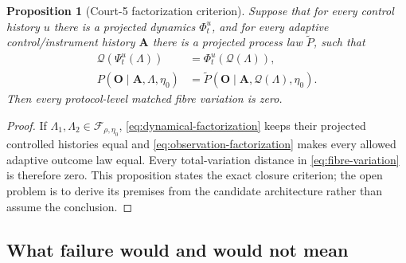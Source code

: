 \documentclass[10pt]{article}
\newtheorem{proposition}[theorem]{Proposition}
\theoremstyle{definition}
\theoremstyle{remark}
\newcommand{\cQ}{\mathcal Q}
\begin{document}
\begin{proposition}[Court-5 factorization criterion]
\label{thm:court5-nogo}
Suppose that for every control history \(u\) there is a projected dynamics \(\Phi_t^u\), and for every adaptive control/instrument history \(\mathbf A\) there is a projected process law \(\widetilde P\), such that
\begin{align}
  \cQ(\Psi_t^u(\Lambda))
  &=\Phi_t^u(\cQ(\Lambda)),
  \label{eq:dynamical-factorization}\\
  P(\mathbf O\mid\mathbf A,\Lambda,\eta_0)
  &=
  \widetilde P(
  \mathbf O\mid
  \mathbf A,\cQ(\Lambda),\eta_0).
  \label{eq:observation-factorization}
\end{align}
Then every protocol-level matched fibre variation is zero.
\end{proposition}

\begin{proof}
If \(\Lambda_1,\Lambda_2\in\mathcal F_{\rho,\eta_0}\), \cref{eq:dynamical-factorization} keeps their projected controlled histories equal and \cref{eq:observation-factorization} makes every allowed adaptive outcome law equal. Every total-variation distance in \cref{eq:fibre-variation} is therefore zero. This proposition states the exact closure criterion; the open problem is to derive its premises from the candidate architecture rather than assume the conclusion.
\end{proof}

\begin{center}
\end{center}

\subsection{What failure would and would not mean}
\end{document}
